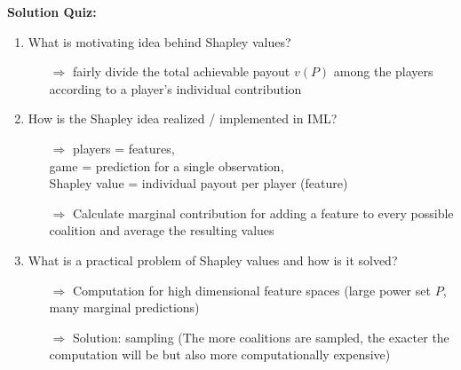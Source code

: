 \textbf{Solution Quiz:}\\\noindent
\medskip

\begin{enumerate}
	\item What is motivating idea behind Shapley values? 
	\begin{itemize}
		\item[$\Rightarrow$] fairly divide the total achievable payout $v(P)$ among the players according to a player’s individual contribution
	\end{itemize}
	\item How is the Shapley idea realized / implemented in IML?
	\begin{itemize}
		\item[$\Rightarrow$] players = features, \\game = prediction for a single observation, \\Shapley value = individual payout per player (feature)
		\item[$\Rightarrow$] Calculate marginal contribution for adding a feature to every possible coalition and average the resulting values
	\end{itemize}
	\item What is a practical problem of Shapley values and how is it solved?
	\begin{itemize}
		\item[$\Rightarrow$] Computation for high dimensional feature spaces (large power set $P$, many marginal predictions)
		\item[$\Rightarrow$] Solution: sampling (The more coalitions are sampled, the exacter the computation will be but also more computationally expensive)

\end{itemize}
\end{enumerate}
